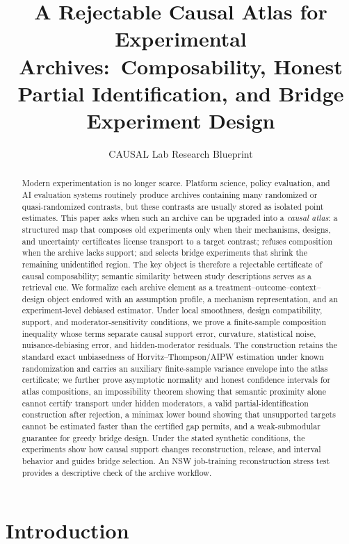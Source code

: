 \documentclass[11pt]{article}
\title{A Rejectable Causal Atlas for Experimental Archives:\ Composability, Honest Partial Identification, and Bridge Experiment Design}
\author{CAUSAL Lab Research Blueprint}
\date{}
\numberwithin{equation}{section}
\newcommand{\1}{\mathbf 1}
\begin{document}
\maketitle

\begin{abstract}
Modern experimentation is no longer scarce.  Platform science, policy evaluation, and AI evaluation systems routinely produce archives containing many randomized or quasi-randomized contrasts, but these contrasts are usually stored as isolated point estimates.  This paper asks when such an archive can be upgraded into a \emph{causal atlas}: a structured map that composes old experiments only when their mechanisms, designs, and uncertainty certificates license transport to a target contrast; refuses composition when the archive lacks support; and selects bridge experiments that shrink the remaining unidentified region.  The key object is therefore a rejectable certificate of causal composability; semantic similarity between study descriptions serves as a retrieval cue.  We formalize each archive element as a treatment--outcome--context--design object endowed with an assumption profile, a mechanism representation, and an experiment-level debiased estimator.  Under local smoothness, design compatibility, support, and moderator-sensitivity conditions, we prove a finite-sample composition inequality whose terms separate causal support error, curvature, statistical noise, nuisance-debiasing error, and hidden-moderator residuals.  The construction retains the standard exact unbiasedness of Horvitz–Thompson/AIPW estimation under known randomization and carries an auxiliary finite-sample variance envelope into the atlas certificate; we further prove asymptotic normality and honest confidence intervals for atlas compositions, an impossibility theorem showing that semantic proximity alone cannot certify transport under hidden moderators, a valid partial-identification construction after rejection, a minimax lower bound showing that unsupported targets cannot be estimated faster than the certified gap permits, and a weak-submodular guarantee for greedy bridge design.  Under the stated synthetic conditions, the experiments show how causal support changes reconstruction, release, and interval behavior and guides bridge selection.  An NSW job-training reconstruction stress test provides a descriptive check of the archive workflow.
\end{abstract}

\section{Introduction}
\label{sec:introduction}
\end{document}

